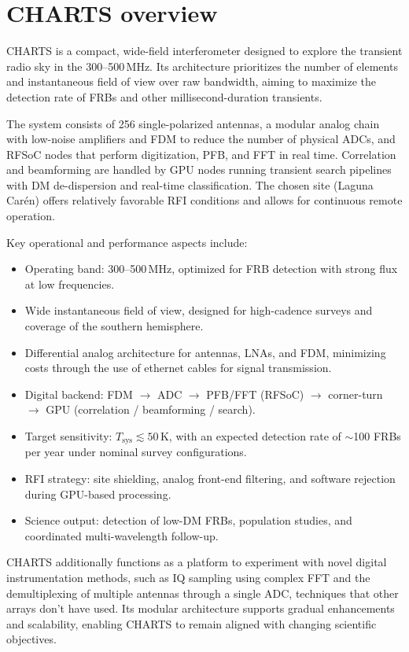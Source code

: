 
\chapter{CHARTS overview}
CHARTS is a compact, wide-field interferometer designed to explore the transient radio sky in the 300--500\,MHz. Its architecture prioritizes the number of elements and instantaneous field of view over raw bandwidth, aiming to maximize the detection rate of FRBs and other millisecond-duration transients.

The system consists of 256 single-polarized antennas, a modular analog chain with low-noise amplifiers and FDM to reduce the number of physical ADCs, and RFSoC nodes that perform digitization, PFB, and FFT in real time. Correlation and beamforming are handled by GPU nodes running transient search pipelines with DM de-dispersion and real-time classification. The chosen site (Laguna Carén) offers relatively favorable RFI conditions and allows for continuous remote operation.

Key operational and performance aspects include:
\begin{itemize}
  \item Operating band: 300--500\,MHz, optimized for FRB detection with strong flux at low frequencies.
  \item Wide instantaneous field of view, designed for high-cadence surveys and coverage of the southern hemisphere.
  \item Differential analog architecture for antennas, LNAs, and FDM, minimizing costs through the use of ethernet cables for signal transmission.
  \item Digital backend: FDM $\rightarrow$ ADC $\rightarrow$ PFB/FFT (RFSoC) $\rightarrow$ corner-turn $\rightarrow$ GPU (correlation / beamforming / search).
  \item Target sensitivity: $T_{\text{sys}} \lesssim 50\,$K, with an expected detection rate of $\sim$100 FRBs per year under nominal survey configurations.
  \item RFI strategy: site shielding, analog front-end filtering, and software rejection during GPU-based processing.
  \item Science output: detection of low-DM FRBs, population studies, and coordinated multi-wavelength follow-up.
\end{itemize}

CHARTS additionally functions as a platform to experiment with novel digital instrumentation methods, such as IQ sampling using complex FFT and the demultiplexing of multiple antennas through a single ADC, techniques that other arrays don't have used. Its modular architecture supports gradual enhancements and scalability, enabling CHARTS to remain aligned with changing scientific objectives.

